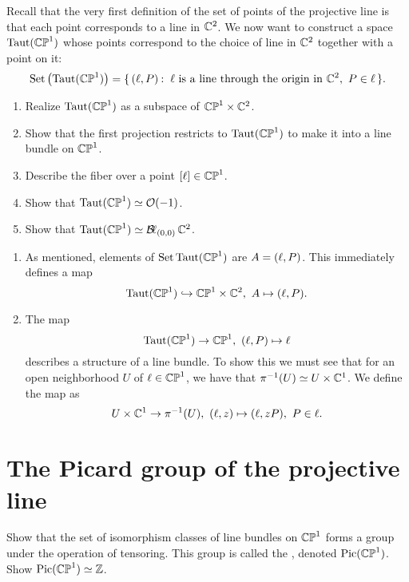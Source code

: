 \documentclass[12pt]{memoir}
\begin{document}
\begin{Ej}
    Recall that the very first definition of the set of points of the projective line is that each point corresponds to a line in $\mathbb{C}^2$. We now want to construct a space $\operatorname{Taut}(\mathbb{CP}^1)$ whose points correspond to the choice of line in $\mathbb{C}^2$ together with a point on it:
    $$\text{Set}\left(\Taut(\bCP^1)\right)=\set{(\l,P)\:\ \l\text{ is a line through the origin in }\bC^2,\ P\in\l}.$$
    \begin{enumerate}
        \item Realize $\operatorname{Taut}(\mathbb{CP}^1)$ as a subspace of $\mathbb{CP}^1\times\mathbb{C}^2$.
        \item Show that the first projection restricts to $\operatorname{Taut}(\mathbb{CP}^1)$ to make it into a line bundle on $\mathbb{CP}^1$.
        \item Describe the fiber over a point $[\ell]\in\mathbb{CP}^1$.
        \item Show that $\operatorname{Taut}(\mathbb{CP}^1)\simeq \mathcal{O}(-1)$.
        \item Show that $\operatorname{Taut}(\mathbb{CP}^1)\simeq \operatorname{\mathcal{B}\!\ell}_{(0,0)}\mathbb{C}^2$.
    \end{enumerate}
\end{Ej}

\begin{ptcbr}
    \begin{enumerate}
        \item As mentioned, elements of $\text{Set}\operatorname{Taut}(\mathbb{CP}^1)$ are $A=(\ell,P)$. This immediately defines a map 
        $$\Taut(\bCP^1)\hookto\bCP^1\x\bC^2,\ A\mapsto (\l,P).$$
        \item The map 
        $$\Taut(\bCP^1)\to\bCP^1,\ (\l,P)\mapsto \l$$
        describes a structure of a line bundle. To show this we must see that for an open neighborhood $U$ of $\ell\in\mathbb{CP}^1$, we have that $\pi^{-1}(U)\simeq U\times\mathbb{C}^1$. We define the map as 
        $$U\x\bC^1\to\pi^{-1}(U),\ (\l,z)\mapsto(\l,zP),\ P\in\l.$$
    \end{enumerate}
\end{ptcbr}

\section{The Picard group of the projective line}

\begin{Ej}
    Show that the set of isomorphism classes of line bundles on $\mathbb{CP}^1$ forms a group under the operation of tensoring. This group is called the , denoted $\operatorname{Pic}(\mathbb{CP}^1)$. Show $\operatorname{Pic}(\mathbb{CP}^1)\simeq\mathbb{Z}$.
\end{Ej}
\end{document}

